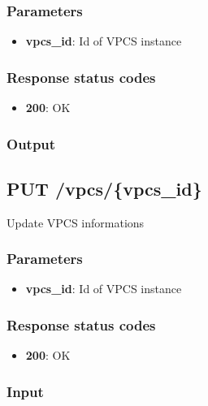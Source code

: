 \documentclass[letterpaper,10pt,english]{sphinxmanual}
\begin{document}
\subsubsection{Parameters}
\label{api/vpcsvpcsid:parameters}\begin{itemize}
\item {} 
\textbf{vpcs\_id}: Id of VPCS instance

\end{itemize}


\subsubsection{Response status codes}
\label{api/vpcsvpcsid:response-status-codes}\begin{itemize}
\item {} 
\textbf{200}: OK

\end{itemize}


\subsubsection{Output}
\label{api/vpcsvpcsid:output}

\subsection{PUT /vpcs/\{vpcs\_id\}}
\label{api/vpcsvpcsid:put-vpcs-vpcs-id}
Update VPCS informations


\subsubsection{Parameters}
\label{api/vpcsvpcsid:id1}\begin{itemize}
\item {} 
\textbf{vpcs\_id}: Id of VPCS instance

\end{itemize}


\subsubsection{Response status codes}
\label{api/vpcsvpcsid:id2}\begin{itemize}
\item {} 
\textbf{200}: OK

\end{itemize}


\subsubsection{Input}
\label{api/vpcsvpcsid:input}
\end{document}
